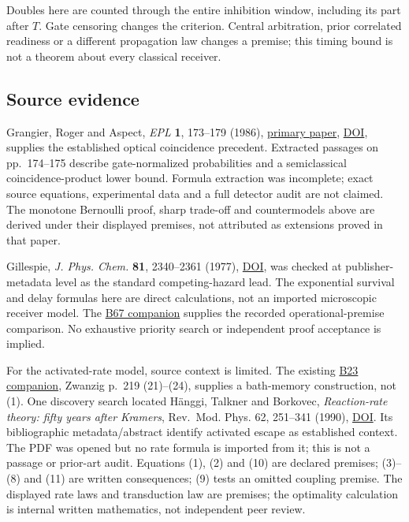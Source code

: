 \documentclass[11pt,a4paper]{article}
\begin{document}
Doubles here are counted through the entire inhibition window, including
its part after \(T\). Gate censoring changes the criterion. Central
arbitration, prior correlated readiness or a different propagation law
changes a premise; this timing bound is not a theorem about every
classical receiver.

\hypertarget{source-evidence}{%
\subsection{Source evidence}\label{source-evidence}}

Grangier, Roger and Aspect, \emph{EPL} \textbf{1}, 173--179 (1986),
\href{https://www.cpt.univ-mrs.fr/~verga/pdfs/Grangier-1986.pdf}{primary
paper}, \href{https://doi.org/10.1209/0295-5075/1/4/004}{DOI}, supplies
the established optical coincidence precedent. Extracted passages on
pp.~174--175 describe gate-normalized probabilities and a semiclassical
coincidence-product lower bound. Formula extraction was incomplete;
exact source equations, experimental data and a full detector audit are
not claimed. The monotone Bernoulli proof, sharp trade-off and
countermodels above are derived under their displayed premises, not
attributed as extensions proved in that paper.

Gillespie, \emph{J. Phys. Chem.} \textbf{81}, 2340--2361 (1977),
\href{https://doi.org/10.1021/j100540a008}{DOI}, was checked at
publisher-metadata level as the standard competing-hazard lead. The
exponential survival and delay formulas here are direct calculations,
not an imported microscopic receiver model. The
\href{../docs/batches/B67/quantum-premise-source-companion.md}{B67
companion} supplies the recorded operational-premise comparison. No
exhaustive priority search or independent proof acceptance is implied.

For the activated-rate model, source context is limited. The existing
\href{../docs/batches/B23/harmonic-receiver-source-companion.md}{B23
companion}, Zwanzig p.~219 (21)--(24), supplies a bath-memory
construction, not (1). One discovery search located Hänggi, Talkner and
Borkovec, \emph{Reaction-rate theory: fifty years after Kramers},
Rev.~Mod. Phys. 62, 251--341 (1990),
\href{https://doi.org/10.1103/RevModPhys.62.251}{DOI}. Its bibliographic
metadata/abstract identify activated escape as established context. The
PDF was opened but no rate formula is imported from it; this is not a
passage or prior-art audit. Equations (1), (2) and (10) are declared
premises; (3)--(8) and (11) are written consequences; (9) tests an
omitted coupling premise. The displayed rate laws and transduction law
are premises; the optimality calculation is internal written
mathematics, not independent peer review.
\end{document}
